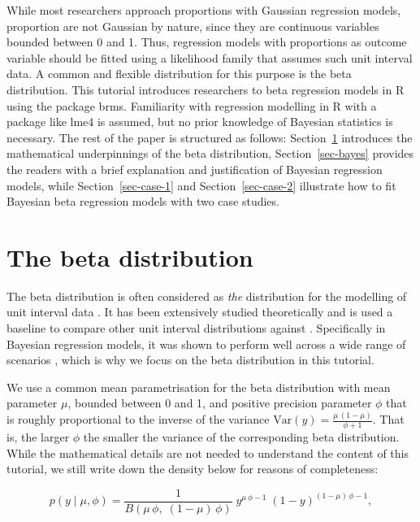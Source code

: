 \documentclass[
  authoryear,
  preprint,
  3p]{elsarticle}
\begin{document}
While most researchers approach proportions with Gaussian regression
models, proportion are not Gaussian by nature, since they are continuous
variables bounded between 0 and 1. Thus, regression models with
proportions as outcome variable should be fitted using a likelihood
family that assumes such unit interval data. A common and flexible
distribution for this purpose is the beta distribution. This tutorial
introduces researchers to beta regression models in R using the package
brms. Familiarity with regression modelling in R with a package like
lme4 is assumed, but no prior knowledge of Bayesian statistics is
necessary. The rest of the paper is structured as follows:
Section~\ref{sec-beta} introduces the mathematical underpinnings of the
beta distribution, Section~\ref{sec-bayes} provides the readers with a
brief explanation and justification of Bayesian regression models, while
Section~\ref{sec-case-1} and Section~\ref{sec-case-2} illustrate how to
fit Bayesian beta regression models with two case studies.

\section{The beta distribution}\label{sec-beta}

The beta distribution is often considered as \emph{the} distribution for
the modelling of unit interval data
\citep{ferrari_beta_2004, cribari-neto_beta_2010}. It has been
extensively studied theoretically
\citep{krysicki_new_1999, gupta_handbook_2014, espinheira_beta_2008} and
is used a baseline to compare other unit interval distributions against
\citep{kieschnick_regression_2003, bonat_regression_2013, lopez_bayesian_2013}.
Specifically in Bayesian regression models, it was shown to perform well
across a wide range of scenarios
\citep{scholz_posterior_2023, scholz_prediction_2025}, which is why we
focus on the beta distribution in this tutorial.

We use a common mean parametrisation for the beta distribution with mean
parameter \(\mu\), bounded between 0 and 1, and positive precision
parameter \(\phi\) that is roughly proportional to the inverse of the
variance \(\text{Var}(y) = \frac{\mu \, (1 - \mu)}{\phi + 1}\). That is,
the larger \(\phi\) the smaller the variance of the corresponding beta
distribution. While the mathematical details are not needed to
understand the content of this tutorial, we still write down the density
below for reasons of completeness:

\[
p(y \mid \mu, \phi) = \frac{1}{B(\mu \, \phi, \; (1-\mu) \, \phi)} \; y^{\mu \, \phi -1} \; (1-y)^{(1-\mu) \, \phi -1},
\]
\end{document}
